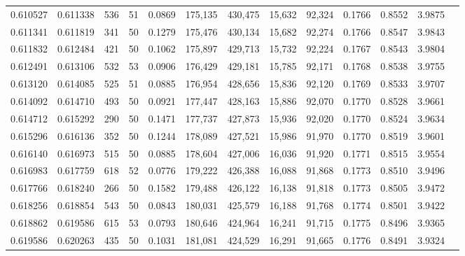 \begin{tabular}{rrrrrrrrrrrrr}
0.610527 & 0.611338 &   536 &  51 &                                     0.0869 & 175,135 & 430,475 &  15,632 &  92,324 & 0.1766 & 0.8552 & 3.9875 \\
0.611341 & 0.611819 &   341 &  50 &                                     0.1279 & 175,476 & 430,134 &  15,682 &  92,274 & 0.1766 & 0.8547 & 3.9843 \\
0.611832 & 0.612484 &   421 &  50 &                                     0.1062 & 175,897 & 429,713 &  15,732 &  92,224 & 0.1767 & 0.8543 & 3.9804 \\
0.612491 & 0.613106 &   532 &  53 &                                     0.0906 & 176,429 & 429,181 &  15,785 &  92,171 & 0.1768 & 0.8538 & 3.9755 \\
0.613120 & 0.614085 &   525 &  51 &                                     0.0885 & 176,954 & 428,656 &  15,836 &  92,120 & 0.1769 & 0.8533 & 3.9707 \\
0.614092 & 0.614710 &   493 &  50 &                                     0.0921 & 177,447 & 428,163 &  15,886 &  92,070 & 0.1770 & 0.8528 & 3.9661 \\
0.614712 & 0.615292 &   290 &  50 &                                     0.1471 & 177,737 & 427,873 &  15,936 &  92,020 & 0.1770 & 0.8524 & 3.9634 \\
0.615296 & 0.616136 &   352 &  50 &                                     0.1244 & 178,089 & 427,521 &  15,986 &  91,970 & 0.1770 & 0.8519 & 3.9601 \\
0.616140 & 0.616973 &   515 &  50 &                                     0.0885 & 178,604 & 427,006 &  16,036 &  91,920 & 0.1771 & 0.8515 & 3.9554 \\
0.616983 & 0.617759 &   618 &  52 &                                     0.0776 & 179,222 & 426,388 &  16,088 &  91,868 & 0.1773 & 0.8510 & 3.9496 \\
0.617766 & 0.618240 &   266 &  50 &                                     0.1582 & 179,488 & 426,122 &  16,138 &  91,818 & 0.1773 & 0.8505 & 3.9472 \\
0.618256 & 0.618854 &   543 &  50 &                                     0.0843 & 180,031 & 425,579 &  16,188 &  91,768 & 0.1774 & 0.8501 & 3.9422 \\
0.618862 & 0.619586 &   615 &  53 &                                     0.0793 & 180,646 & 424,964 &  16,241 &  91,715 & 0.1775 & 0.8496 & 3.9365 \\
0.619586 & 0.620263 &   435 &  50 &                                     0.1031 & 181,081 & 424,529 &  16,291 &  91,665 & 0.1776 & 0.8491 & 3.9324 \\

\end{tabular}
